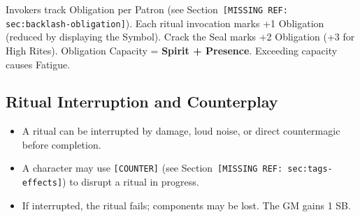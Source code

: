 Invokers track Obligation per Patron (see Section~\texttt{[MISSING REF: sec:backlash-obligation]}). Each ritual invocation marks +1 Obligation (reduced by displaying the Symbol). Crack the Seal marks +2 Obligation (+3 for High Rites). Obligation Capacity = \textbf{Spirit + Presence}. Exceeding capacity causes Fatigue.

\subsection{Ritual Interruption and Counterplay}
\begin{itemize}
  \item A ritual can be interrupted by damage, loud noise, or direct countermagic before completion.
  \item A character may use \texttt{[COUNTER]} (see Section~\texttt{[MISSING REF: sec:tags-effects]}) to disrupt a ritual in progress.
  \item If interrupted, the ritual fails; components may be lost. The GM gains 1 SB.
\end{itemize}

